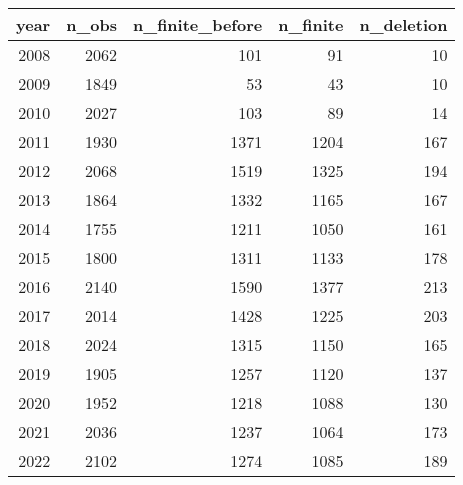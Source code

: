 \begin{tabular}{rrrrr}
\toprule
year & n_obs & n_finite_before & n_finite & n_deletion \\
\midrule
2008 & 2062 & 101 & 91 & 10 \\
2009 & 1849 & 53 & 43 & 10 \\
2010 & 2027 & 103 & 89 & 14 \\
2011 & 1930 & 1371 & 1204 & 167 \\
2012 & 2068 & 1519 & 1325 & 194 \\
2013 & 1864 & 1332 & 1165 & 167 \\
2014 & 1755 & 1211 & 1050 & 161 \\
2015 & 1800 & 1311 & 1133 & 178 \\
2016 & 2140 & 1590 & 1377 & 213 \\
2017 & 2014 & 1428 & 1225 & 203 \\
2018 & 2024 & 1315 & 1150 & 165 \\
2019 & 1905 & 1257 & 1120 & 137 \\
2020 & 1952 & 1218 & 1088 & 130 \\
2021 & 2036 & 1237 & 1064 & 173 \\
2022 & 2102 & 1274 & 1085 & 189 \\
\bottomrule
\end{tabular}
